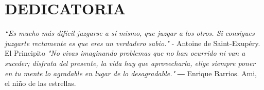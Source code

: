 \chapter*{DEDICATORIA}

\begin{flushright}
    \textit{
        “Es mucho más difícil juzgarse a sí mismo, que juzgar a los otros. Si consigues juzgarte rectamente es que eres un verdadero sabio."
    }
    - Antoine de Saint-Exupéry. El Principito
    \vspace{2cm}
    \textit{"No vivas imaginando problemas que no han ocurrido ni van a suceder; disfruta del presente, la vida hay que aprovecharla, elige siempre poner en tu mente lo agradable en lugar de lo desagradable."
    }
    ― Enrique Barrios. Ami, el niño de las estrellas.

\end{flushright}
